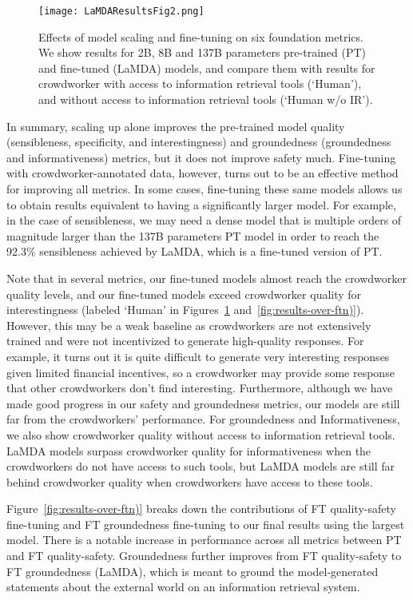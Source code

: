 \documentclass{article}
\begin{document}
\begin{figure}[h!]
    \centering
\texttt{[image: LaMDAResultsFig2.png]}
    \caption{Effects of model scaling and fine-tuning on six foundation metrics. We show results for 2B, 8B and 137B parameters pre-trained (PT) and fine-tuned (LaMDA) models, and compare them with results for crowdworker with access to information retrieval tools (`Human'), and without access to information retrieval tools (`Human w/o IR').}
    \label{fig:results-over-size}
\end{figure}

In summary, scaling up alone improves the pre-trained model quality (sensibleness, specificity, and interestingness) and groundedness (groundedness and informativeness) metrics, but it does not improve safety much. Fine-tuning with crowdworker-annotated data, however, turns out to be an effective method for improving all metrics. In some cases, fine-tuning these same models allows us to obtain results equivalent to having a significantly larger model. For example, in the case of sensibleness, we may need a dense model that is multiple orders of magnitude larger than the 137B parameters PT model in order to reach the 92.3\% sensibleness achieved by LaMDA, which is a fine-tuned version of PT.

Note that in several metrics, our fine-tuned models almost reach the crowdworker quality levels, and our fine-tuned models exceed crowdworker quality for interestingness (labeled `Human' in Figures~\ref{fig:results-over-size} and~\ref{fig:results-over-ftn)}). However, this may be a weak baseline as crowdworkers are not extensively trained and were not incentivized to generate high-quality responses. For example, it turns out it is quite difficult to generate very interesting responses given limited financial incentives, so a crowdworker may provide some response that other crowdworkers don't find interesting. Furthermore, although we have made good progress in our safety and groundedness metrics, our models are still far from the crowdworkers' performance. For groundedness and Informativeness, we also show crowdworker quality without access to information retrieval tools. LaMDA models surpass crowdworker quality for informativeness when the crowdworkers do not have access to such tools, but LaMDA models are still far behind crowdworker quality when crowdworkers have access to these tools.

Figure~\ref{fig:results-over-ftn)} breaks down the contributions of FT quality-safety fine-tuning and FT groundedness fine-tuning to our final results using the largest model. There is a notable increase in performance across all metrics between PT and FT quality-safety. Groundedness further improves from FT quality-safety to FT groundedness (LaMDA), which is meant to ground the model-generated statements about the external world on an information retrieval system.
\end{document}
